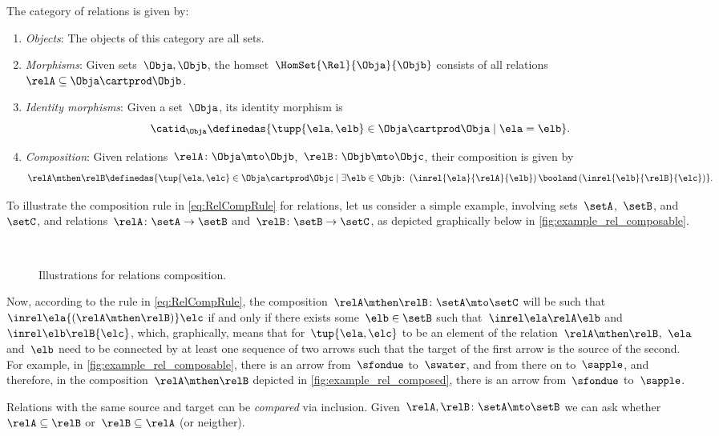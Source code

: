
\begin{ctdefinition}
	\label{def:Rel}
	The category of relations \iindex{\Rel}  is given by:
	\begin{enumerate}
		\item \emph{Objects}: The objects of this category are all sets.
		\item \emph{Morphisms}: Given sets~$\Obja, \Objb$, the homset~$\HomSet{\Rel}{\Obja}{\Objb}$ consists of all relations~$\relA\subseteq \Obja\cartprod \Objb$.
		\item \emph{Identity morphisms}: Given a set~$\Obja$, its identity morphism is
		\begin{equation}
			\catid_\Obja \definedas \{ \tupp{\ela,\elb} \in \Obja \cartprod \Obja \mid  \ela = \elb \}.
		\end{equation}
		\item \emph{Composition}: Given relations~$\relA \colon \Obja\mto \Objb$,~$\relB \colon \Objb\mto \Objc$, their composition is given by
		\begin{equation}
			\label{eq:RelCompRule}
			\relA \mthen \relB \definedas \{\tup{\ela,\elc} \in \Obja \cartprod \Objc \mid  \exists \elb \in \Objb \colon \left(\inrel{\ela}{\relA}{\elb} \right) \booland \left(\inrel{\elb}{\relB}{\elc}\right)\}.
		\end{equation}
	\end{enumerate}
\end{ctdefinition}

To illustrate the composition rule in \cref{eq:RelCompRule} for relations, let us consider a simple example, involving sets~$\setA$,~$\setB$, and~$\setC$, and relations~$\relA \colon \setA \to \setB$ and~$\relB \colon \setB \to \setC$, as depicted graphically below in \cref{fig:example_rel_composable}.
%
\begin{figure}[h!]
	\centering
	\\
	\caption{Illustrations for relations composition.}

\end{figure}
%
Now, according to the rule in \cref{eq:RelCompRule}, the composition~$\relA \mthen \relB \colon \setA \mto \setC$ will be such that~$\inrel \ela {(\relA \mthen \relB)} \elc$ if and only if there exists some~$\elb \in \setB$ such that~$\inrel \ela \relA \elb $ and~$\inrel \elb \relB{\elc}$, which, graphically, means that for~$\tup{\ela,\elc}$ to be an element of the relation~$\relA \mthen \relB$,~$\ela$ and~$\elb$ need to be connected by at least one sequence of two arrows such that the target of the first arrow is the source of the second.
For example, in \cref{fig:example_rel_composable}, there is an arrow from~$\sfondue$ to~$\swater$, and from there on to~$\sapple$, and therefore, in the composition~$\relA \mthen \relB$ depicted in \cref{fig:example_rel_composed}, there is an arrow from~$\sfondue$ to~$\sapple$.

\begin{remark}
	Relations with the same source and target can be \emph{compared} via inclusion.
	Given~$\relA, \relB \colon \setA\mto \setB$  we can ask whether~$\relA\subseteq \relB$ or~$\relB\subseteq \relA$ (or neigther).
\end{remark}
